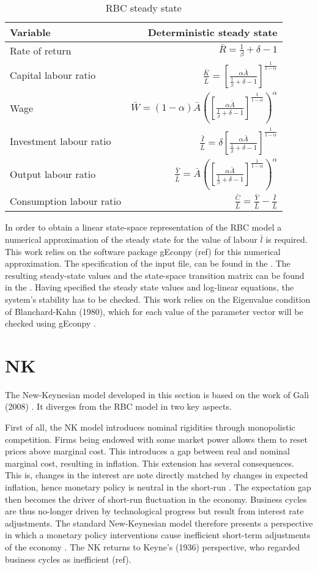 \documentclass[12pt,a4paper,english]{article} %
\newcommand{\Rss}{\frac{1}{\beta} + \delta - 1}
\newcommand{\Ass}{\bar{A}}
\newcommand{\KLss}{\left[ \frac{\alpha \Ass}{\Rss} \right]^{\frac{1}{1-\alpha}}}
\let\oldsection\section
\renewcommand\section{\clearpage\oldsection}
\begin{document}
	\begin{table}[H]
		\fontsize{9pt}{9pt}\selectfont
		\centering
		\caption{RBC steady state}
		\begin{tabular}{lr}
			\textbf{Variable} & \textbf{Deterministic steady state}\\
			\hline 
			Rate of return & $\bar{R} = \Rss$ \\
			Capital labour ratio & $\frac{\bar{K}}{\bar{L}} = \KLss$ \\
			Wage & $\bar{W} = (1 - \alpha) \Ass \left(\KLss\right)^\alpha$ \\
			Investment labour ratio & $\frac{\bar{I}}{\bar{L}} = \delta \KLss$ \\
			Output labour ratio & $\frac{\bar{Y}}{\bar{L}} = \Ass \left(\KLss\right)^\alpha$ \\
			Consumption labour ratio & $\frac{\bar{C}}{\bar{L}} = \frac{\bar{Y}}{\bar{L}} - \frac{\bar{I}}{\bar{L}}$ \\
		\end{tabular}
	\end{table}

	In order to obtain a linear state-space representation of the RBC model a numerical approximation of the steady state for the value of labour $\bar{l}$ is required. This work relies on the software package gEconpy (ref) for this numerical approximation. The specification of the input file, can be found in the . The resulting steady-state values and the state-space transition matrix can be found in the . 
	Having specified the steady state values and log-linear equations, the system's stability has to be checked. This work relies on the Eigenvalue condition of Blanchard-Kahn (1980), which for each value of the parameter vector will be checked using gEconpy \cite{blanchard_solution_1980}.

	\section{NK} \label{sec:NK}
	The New-Keynesian model developed in this section is based on the work of Galì (2008) \cite{gali_monetary_2008}. It diverges from the RBC model in two key aspects.
	
	First of all, the NK model introduces nominal rigidities through monopolistic competition. Firms being endowed with some market power allows them to reset prices above marginal cost. This introduces a gap between real and nominal marginal cost, resulting in inflation. This extension has several consequences. This is, changes in the interest are note directly matched by changes in expected inflation, hence monetary policy is neutral in the short-run \cite{gali_monetary_2008}. The expectation gap then becomes the driver of short-run fluctuation in the economy. Business cycles are thus no-longer driven by technological progress but result from interest rate adjustments. The standard New-Keynesian model therefore presents a perspective in which a monetary policy interventions cause inefficient short-term adjustments of the economy \cite{gali_monetary_2008}. The NK returns to Keyne's (1936) perspective, who regarded business cycles as inefficient (ref). 
	
\end{document}
